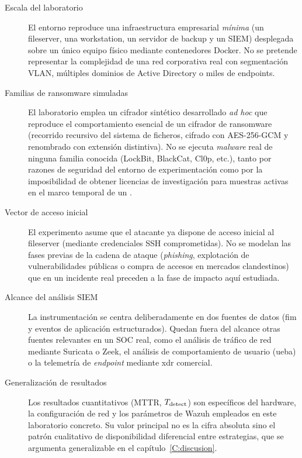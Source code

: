\documentclass[../main.tex]{subfiles}
\begin{document}
\begin{description}
  \item[Escala del laboratorio] El entorno reproduce una infraestructura
  empresarial \emph{mínima} (un fileserver, una workstation, un servidor de
  backup y un SIEM) desplegada sobre un único equipo físico mediante
  contenedores Docker. No se pretende representar la complejidad de una red
  corporativa real con segmentación VLAN, múltiples dominios de Active
  Directory o miles de endpoints.

  \item[Familias de ransomware simuladas] El laboratorio emplea un cifrador
  sintético desarrollado \textit{ad hoc} que reproduce el comportamiento
  esencial de un cifrador de ransomware (recorrido recursivo del sistema de
  ficheros, cifrado con AES-256-GCM y renombrado con extensión distintiva).
  No se ejecuta \textit{malware} real de ninguna familia conocida (LockBit,
  BlackCat, Cl0p, etc.), tanto por razones de seguridad del entorno de
  experimentación como por la imposibilidad de obtener licencias de
  investigación para muestras activas en el marco temporal de un \pfg.

  \item[Vector de acceso inicial] El experimento asume que el atacante ya
  dispone de acceso inicial al fileserver (mediante credenciales SSH
  comprometidas). No se modelan las fases previas de la cadena de ataque (\textit{phishing}, explotación de vulnerabilidades públicas o compra
  de accesos en mercados clandestinos) que en un incidente real
  preceden a la fase de impacto aquí estudiada.

  \item[Alcance del análisis SIEM] La instrumentación se centra
  deliberadamente en dos fuentes de datos (\gls{fim} y eventos de
  aplicación estructurados). Quedan fuera del alcance otras fuentes
  relevantes en un SOC real, como el análisis de tráfico de red mediante
  Suricata o Zeek, el análisis de comportamiento de usuario
  (\gls{ueba}) o la telemetría de \textit{endpoint} mediante \gls{xdr}
  comercial.

  \item[Generalización de resultados] Los resultados cuantitativos (MTTR,
  $T_{\text{detect}}$) son específicos del hardware, la configuración de red y los
  parámetros de Wazuh empleados en este laboratorio concreto. Su valor
  principal no es la cifra absoluta sino el patrón cualitativo de
  disponibilidad diferencial entre estrategias, que se argumenta
  generalizable en el capítulo~\ref{C:discusion}.
\end{description}
\end{document}
